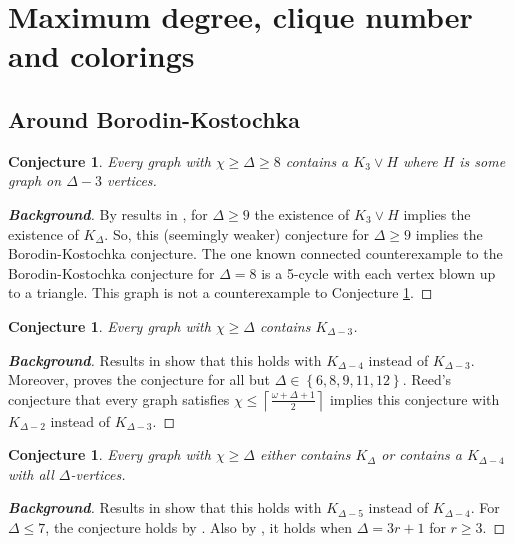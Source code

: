 \documentclass[12pt]{article}
\theoremstyle{plain}
\newtheorem{conjecture}[thm]{Conjecture}
\theoremstyle{definition}
\theoremstyle{remark}
\newcommand{\set}[1]{\left\{ #1 \right\}}
\newcommand{\ceil}[1]{\left\lceil#1\right\rceil}
\begin{document}
\section{Maximum degree, clique number and colorings}
\subsection{Around Borodin-Kostochka}
\begin{conjecture}\label{C3}
Every graph with $\chi \ge \Delta \ge 8$ contains a $K_3 \vee H$ where $H$ is some graph on $\Delta - 3$ vertices.
\end{conjecture}
\begin{proof}[\textbf{Background}]
By results in \cite{mules}, for $\Delta \ge 9$ the existence of $K_3 \vee H$ implies the existence of $K_\Delta$.  
So, this (seemingly weaker) conjecture for $\Delta \ge 9$ implies the Borodin-Kostochka conjecture.  The one known connected counterexample to 
the Borodin-Kostochka conjecture for $\Delta=8$ is a 5-cycle with each vertex blown up to a triangle.  This graph is not a counterexample to Conjecture \ref{C3}.
\end{proof}

\begin{conjecture}\label{C4}
Every graph with $\chi \ge \Delta$ contains $K_{\Delta-3}$.
\end{conjecture}
\begin{proof}[\textbf{Background}]
Results in \cite{bigcliques} show that this holds with $K_{\Delta-4}$ instead of $K_{\Delta-3}$.  Moreover, \cite{bigcliques} proves the conjecture for all but $\Delta \in \set{6,8,9,11,12}$.
Reed's conjecture \cite{reed1998omega} that every graph satisfies $\chi \le \ceil{\frac{\omega + \Delta + 1}{2}}$ implies this conjecture with $K_{\Delta-2}$ instead of $K_{\Delta-3}$.
\end{proof}

\begin{conjecture}\label{C5}
Every graph with $\chi \ge \Delta$ either contains $K_{\Delta}$ or contains a $K_{\Delta-4}$ with all $\Delta$-vertices.
\end{conjecture}
\begin{proof}[\textbf{Background}]
Results in \cite{bigcliques} show that this holds with $K_{\Delta-5}$ instead of $K_{\Delta-4}$. For $\Delta \le 7$, the conjecture holds by \cite{rabern2010a, krs_one}.
Also by \cite{bigcliques}, it holds when $\Delta = 3r+1$ for $r \ge 3$.
\end{proof}
\end{document}
